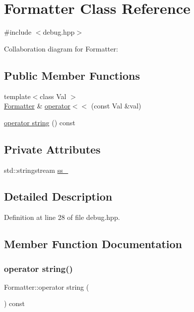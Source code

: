 \hypertarget{class_formatter}{}\section{Formatter Class Reference}
\label{class_formatter}


{\ttfamily \#include $<$debug.\+hpp$>$}



Collaboration diagram for Formatter\+:
\subsection*{Public Member Functions}
\begin{DoxyCompactItemize}
\item 
{\footnotesize template$<$class Val $>$ }\\\hyperlink{class_formatter}{Formatter} \& \hyperlink{class_formatter_a208a413dca6b2f7eb5fdb60c7a247497}{operator$<$$<$} (const Val \&val)
\item 
\hyperlink{class_formatter_a549da38b8cc0aa2017a8b9710a2a7b47}{operator string} () const
\end{DoxyCompactItemize}
\subsection*{Private Attributes}
\begin{DoxyCompactItemize}
\item 
std\+::stringstream \hyperlink{class_formatter_aff30cab66aec215a9a0221e11134943b}{ss\+\_\+}
\end{DoxyCompactItemize}


\subsection{Detailed Description}


Definition at line 28 of file debug.\+hpp.



\subsection{Member Function Documentation}
\mbox{\label{class_formatter_a549da38b8cc0aa2017a8b9710a2a7b47}} 
\subsubsection{\texorpdfstring{operator string()}{operator string()}}
{\footnotesize\ttfamily Formatter\+::operator string (\begin{DoxyParamCaption}{ }\end{DoxyParamCaption}) const\hspace{0.3cm}{\ttfamily [inline]}}



